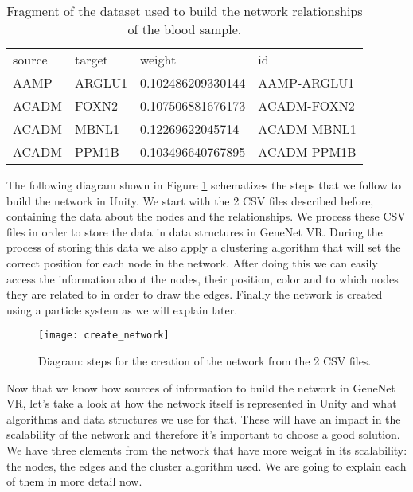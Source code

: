 \begin{table}[h!]
\centering
\begin{tabular}{llll}
\hline
source & target & weight            & id          \\
AAMP   & ARGLU1 & 0.102486209330144 & AAMP-ARGLU1 \\
ACADM  & FOXN2  & 0.107506881676173 & ACADM-FOXN2 \\
ACADM  & MBNL1  & 0.12269622045714  & ACADM-MBNL1 \\
ACADM  & PPM1B  & 0.103496640767895 & ACADM-PPM1B \\
\hline
\end{tabular}
\caption{Fragment of the dataset used to build the network relationships of the blood sample.}
\label{tab:network-data}
\end{table}

The following diagram shown in Figure \ref{fig:create_network} schematizes the steps that we follow to build the network in Unity. We start with the 2 CSV files described before, containing the data about the nodes and the relationships. We process these CSV files in order to store the data in data structures in GeneNet VR. During the process of storing this data we also apply a clustering algorithm that will set the correct position for each node in the network. After doing this we can easily access the information about the nodes, their position, color and to which nodes they are related to in order to draw the edges. Finally the network is created using a particle system as we will explain later.

\begin{figure}[h!]
    \centering%
    \texttt{[image: create\_network]}
    \caption{Diagram: steps for the creation of the network from the 2 CSV files.}
    \label{fig:create_network}
\end{figure}%

Now that we know how sources of information to build the network in GeneNet VR, let's take a look at how the network itself is represented in Unity and what algorithms and data structures we use for that. These will have an impact in the scalability of the network and therefore it's important to choose a good solution. We have three elements from the network that have more weight in its scalability: the nodes, the edges and the cluster algorithm used. We are going to explain each of them in more detail now.

